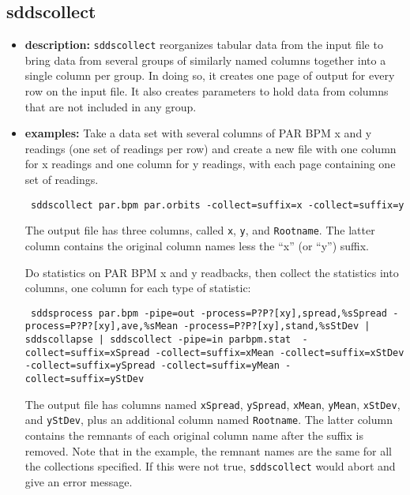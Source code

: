 \begin{latexonly} 
\newpage 
\end{latexonly} 
 
\subsection{sddscollect} 
\label{sddscollect} 
 
\begin{itemize} 
\item {\bf description:} 
\verb|sddscollect| reorganizes tabular data from the input file 
to bring data from several groups of similarly named columns together into  
a single column per group.  In doing so, it creates one page of output 
for every row on the input file.  It also creates parameters to 
hold data from columns that are not included in any group. 
 
\item {\bf examples:}  
Take a data set with several columns of PAR BPM x and y 
readings (one set of readings per row) and create a new file with one column for x 
readings and one column for y readings, with each  
page containing one set of readings.
\begin{flushleft}{\tt 
sddscollect par.bpm par.orbits -collect=suffix=x -collect=suffix=y 
}\end{flushleft} 
The output file has three columns, called \verb|x|, \verb|y|, and 
\verb|Rootname|.  The latter column contains the original column 
names less the ``x'' (or ``y'') suffix.   
 
Do statistics on PAR BPM x and y readbacks, then collect the statistics  
into columns, one column for each type of statistic: 
\begin{flushleft}{\tt  
sddsprocess par.bpm -pipe=out -process=P?P?[xy],spread,\%sSpread  
-process=P?P?[xy],ave,\%sMean -process=P?P?[xy],stand,\%sStDev  
| sddscollapse  
| sddscollect -pipe=in parbpm.stat \ 
  -collect=suffix=xSpread -collect=suffix=xMean -collect=suffix=xStDev 
  -collect=suffix=ySpread -collect=suffix=yMean -collect=suffix=yStDev 
} 
\end{flushleft} 
The output file has columns named {\tt xSpread}, {\tt ySpread},  
{\tt xMean}, {\tt yMean}, {\tt xStDev}, 
and {\tt yStDev}, plus an additional column named {\tt Rootname}. 
The latter column contains the remnants of each original column 
name after the suffix is removed.  Note that in the example, 
the remnant names are the same for all the collections specified. 
If this were not true, \verb|sddscollect| would abort and give 
an error message. 
 

\end{itemize}
